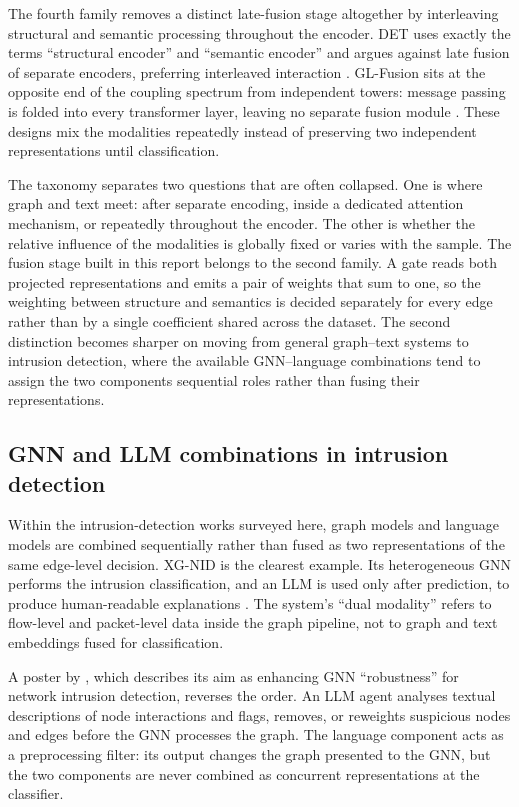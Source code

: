 The fourth family removes a distinct late-fusion stage altogether by interleaving structural
and semantic processing throughout the encoder. DET uses exactly the terms ``structural
encoder'' and ``semantic encoder'' and argues against late fusion of separate encoders,
preferring interleaved interaction \citep{guo2024det}. GL-Fusion sits at the opposite end of
the coupling spectrum from independent towers: message passing is folded into every
transformer layer, leaving no separate fusion module \citep{yang2024glfusion}. These designs
mix the modalities repeatedly instead of preserving two independent representations until
classification.

The taxonomy separates two questions that are often collapsed. One is where graph and text
meet: after separate encoding, inside a dedicated attention mechanism, or repeatedly
throughout the encoder. The other is whether the relative influence of the modalities is
globally fixed or varies with the sample. The fusion stage built in this report belongs to the
second family. A gate reads both projected representations and emits a pair of weights that sum
to one, so the weighting between structure and semantics is decided separately for every edge
rather than by a single coefficient shared across the dataset. The second distinction becomes
sharper on moving
from general graph--text systems to intrusion detection, where the available GNN--language
combinations tend to assign the two components sequential roles rather than fusing their
representations.

\subsection{GNN and LLM combinations in intrusion detection}

Within the intrusion-detection works surveyed here, graph models and language models are
combined sequentially rather than fused as two representations of the same edge-level
decision. XG-NID is the clearest example. Its heterogeneous GNN performs the intrusion
classification, and an LLM is used only after prediction, to produce human-readable
explanations \citep{farrukh2025xgnid}. The system's ``dual modality'' refers to flow-level
and packet-level data inside the graph pipeline, not to graph and text embeddings fused for
classification.

A poster by \citet{zhan2025agentgnn}, which describes its aim as enhancing GNN ``robustness'' for network intrusion detection, reverses the order. %
An LLM agent analyses textual descriptions of node interactions and flags, removes, or
reweights suspicious nodes and edges before the GNN processes the graph. The language component
acts as a preprocessing filter: its output changes the graph presented to the GNN, but the
two components are never combined as concurrent representations at the classifier.

